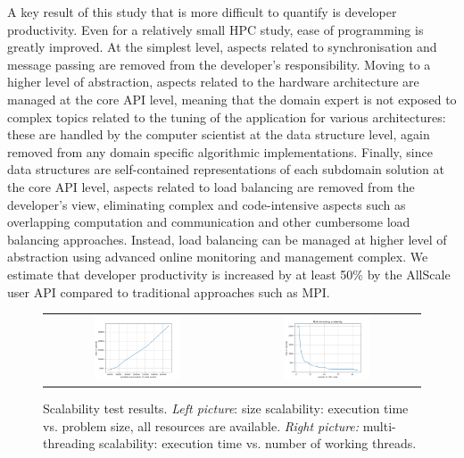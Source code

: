 \documentclass[acmsmall,review,anonymous]{acmart}\settopmatter{printfolios=true,printccs=false,printacmref=false}
\begin{document}
A key result of this study that is more difficult to quantify is developer productivity. Even for a relatively small HPC study, ease of programming is greatly improved. At the simplest level, aspects related to synchronisation and message passing are removed from the developer's responsibility. Moving to a higher level of abstraction, aspects related to the hardware architecture are managed at the core API level, meaning that the domain expert is not exposed to complex topics related to the tuning of the application for various architectures: these are handled by the computer scientist at the data structure level, again removed from any domain specific algorithmic implementations. Finally, since data structures are self-contained representations of each subdomain solution at the core API level, aspects related to load balancing are removed from the developer's view, eliminating complex and code-intensive aspects such as overlapping computation and communication and other cumbersome load balancing approaches. Instead, load balancing can be managed at higher level of abstraction using advanced online monitoring and management complex. We estimate that developer productivity is increased by at least 50\% by the AllScale user API compared to traditional approaches such as MPI. 

\begin{figure}
\begin{tabular}{cc}
\includegraphics[width=0.48\textwidth]{images/scalability-size} & 
\includegraphics[width=0.48\textwidth]{images/scalability-mt} 
\end{tabular}
\caption{Scalability test results. \textit{Left picture}: size scalability: execution time vs. problem size, all resources are available. \textit{Right picture:} multi-threading scalability: execution time vs. number of working threads.}
\label{fig:scalability}
\end{figure}
\end{document}
